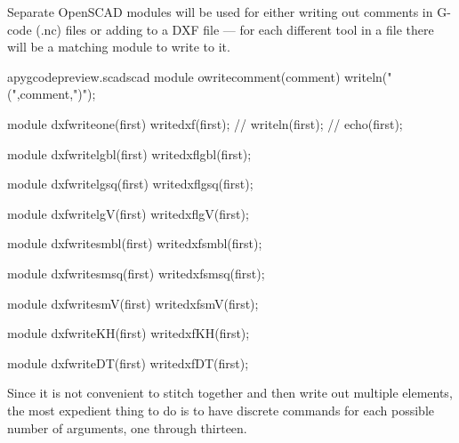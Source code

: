 \documentclass{ltxdoc}
\begin{document}
Separate OpenSCAD modules will be used for either writing out comments in G-code (.nc) files
or adding to a DXF file --- for each different tool in a file there will be a matching
module to write to it.
 
\lstset{firstnumber=\thepyscad}
\begin{writecode}{a}{pygcodepreview.scad}{scad}
module owritecomment(comment) {
	writeln("(",comment,")");
}

module dxfwriteone(first) {
	writedxf(first);
//	writeln(first);
//	echo(first);
}

module dxfwritelgbl(first) {
	writedxflgbl(first);
}

module dxfwritelgsq(first) {
	writedxflgsq(first);
}

module dxfwritelgV(first) {
	writedxflgV(first);
}

module dxfwritesmbl(first) {
	writedxfsmbl(first);
}

module dxfwritesmsq(first) {
	writedxfsmsq(first);
}

module dxfwritesmV(first) {
	writedxfsmV(first);
}

module dxfwriteKH(first) {
	writedxfKH(first);
}

module dxfwriteDT(first) {
	writedxfDT(first);
}

\end{writecode}
\addtocounter{pyscad}{42}
%

Since it is not convenient to stitch together and then write out multiple elements,
the most expedient thing to do is to have discrete commands for each possible number
of arguments, one through thirteen.
 
\end{document}
